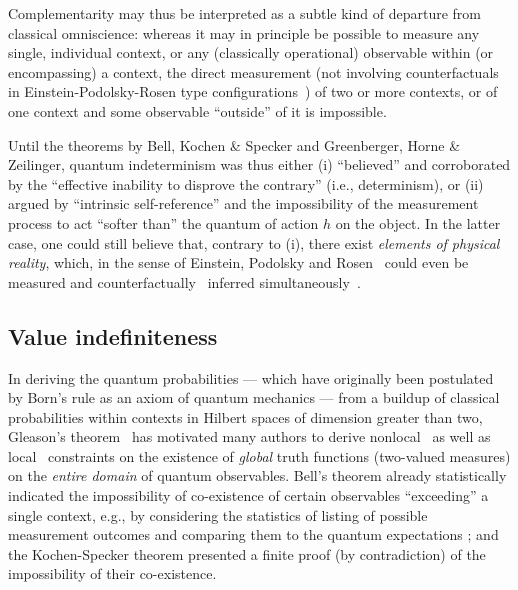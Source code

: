 \documentclass[%
 preprint,
 showpacs,
 showkeys,
 preprintnumbers,
 amsmath,amssymb,
 aps,
 prl,
  longbibliography,
 ]{revtex4-1}
\begin{document}
Complementarity may thus be interpreted as a subtle kind of departure from
classical omniscience:
whereas it may in principle be possible to measure any single, individual context,
or any (classically operational) observable within (or encompassing) a context,
the direct measurement
(not involving counterfactuals in Einstein-Podolsky-Rosen type configurations~\cite{epr,svozil-2006-omni})
of two or more contexts, or of one context and some observable ``outside'' of it
is impossible.

Until the theorems by Bell, Kochen \& Specker and Greenberger, Horne \& Zeilinger, quantum indeterminism was thus either
(i) ``believed'' and corroborated by the ``effective inability to disprove the contrary'' (i.e., determinism), or
(ii) argued by ``intrinsic self-reference'' and the impossibility of the measurement process
 to act ``softer than'' the quantum of action $h$ on the object.
In the latter case, one could still believe that, contrary to (i), there exist {\em elements of physical reality}, which,
in the sense of Einstein, Podolsky and Rosen~\cite{epr} could even be  measured and
counterfactually~\cite{svozil-2006-omni} inferred simultaneously~\cite{svozil-2006-uniquenessprinciple}.


\subsection{Value indefiniteness}

In deriving the quantum probabilities
---
which have originally been postulated by Born's rule as an axiom of quantum mechanics
---
from a buildup of classical probabilities within contexts in Hilbert spaces of dimension greater than two,
Gleason's theorem~\cite{Gleason,pitowsky:218,rich-bridge,r:dvur-93}
has motivated many authors to derive
nonlocal~\cite{bell,peres222,hey-red,ghz,mermin-93,zeilinger-epr-98}
as well as local~\cite{specker-60,kochen1,ZirlSchl-65,Alda,Alda2,kamber64,kamber65,peres-91,svozil-tkadlec,cabello-96,cabello:210401}
constraints on the existence of {\em global} truth functions (two-valued measures)
on the {\em entire domain} of quantum observables.
Bell's theorem already statistically indicated the
impossibility of co-existence of certain observables
``exceeding'' a single context, e.g.,
by considering the statistics of listing of possible measurement outcomes
and comparing them to the quantum expectations
\cite{peres222}; and the
Kochen-Specker theorem presented a finite proof (by contradiction)
of the impossibility of their co-existence.
\end{document}

